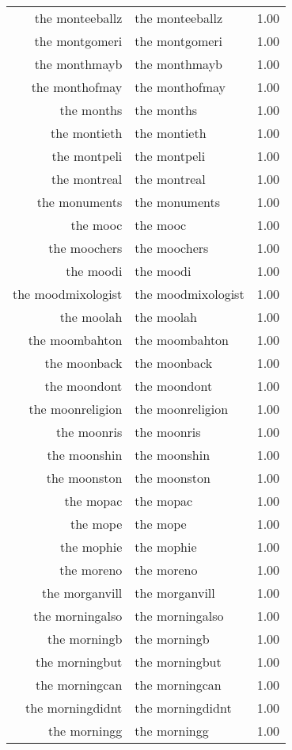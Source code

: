 \begin{table}[ht]
\begin{tabular}{rlr}
  the monteeballz & the monteeballz & 1.00 \\ 
  the montgomeri & the montgomeri & 1.00 \\ 
  the monthmayb & the monthmayb & 1.00 \\ 
  the monthofmay & the monthofmay & 1.00 \\ 
  the months & the months & 1.00 \\ 
  the montieth & the montieth & 1.00 \\ 
  the montpeli & the montpeli & 1.00 \\ 
  the montreal & the montreal & 1.00 \\ 
  the monuments & the monuments & 1.00 \\ 
  the mooc & the mooc & 1.00 \\ 
  the moochers & the moochers & 1.00 \\ 
  the moodi & the moodi & 1.00 \\ 
  the moodmixologist & the moodmixologist & 1.00 \\ 
  the moolah & the moolah & 1.00 \\ 
  the moombahton & the moombahton & 1.00 \\ 
  the moonback & the moonback & 1.00 \\ 
  the moondont & the moondont & 1.00 \\ 
  the moonreligion & the moonreligion & 1.00 \\ 
  the moonris & the moonris & 1.00 \\ 
  the moonshin & the moonshin & 1.00 \\ 
  the moonston & the moonston & 1.00 \\ 
  the mopac & the mopac & 1.00 \\ 
  the mope & the mope & 1.00 \\ 
  the mophie & the mophie & 1.00 \\ 
  the moreno & the moreno & 1.00 \\ 
  the morganvill & the morganvill & 1.00 \\ 
  the morningalso & the morningalso & 1.00 \\ 
  the morningb & the morningb & 1.00 \\ 
  the morningbut & the morningbut & 1.00 \\ 
  the morningcan & the morningcan & 1.00 \\ 
  the morningdidnt & the morningdidnt & 1.00 \\ 
  the morningg & the morningg & 1.00 \\ 

\end{tabular}
\end{table}
